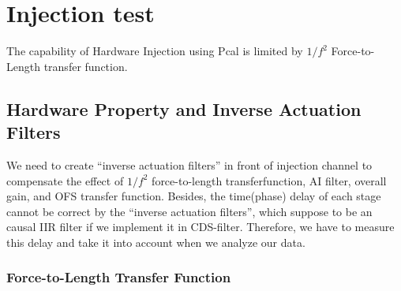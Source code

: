 \begin{center}
\end{center}

\section{Injection test}
The capability of Hardware Injection using Pcal is limited by $1/f^2$ Force-to-Length transfer function.

\subsection{Hardware Property and Inverse Actuation Filters}
We need to create “inverse actuation filters” in front of injection channel to compensate the effect of $1/f^2$ force-to-length transferfunction, AI filter, overall gain, and OFS transfer function\cite{ligo:inj}. Besides, the time(phase) delay of each stage cannot be correct by the “inverse actuation filters”, which suppose to be an causal IIR filter if we implement it in CDS-filter. Therefore, we have to measure this delay and take it into account when we analyze our data.
    \subsubsection{Force-to-Length Transfer Function}
